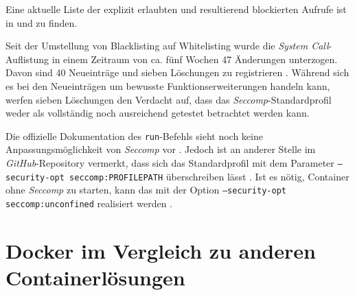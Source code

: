 \documentclass[../main.tex]{subfiles}
\begin{document}
			Eine aktuelle Liste der explizit erlaubten und resultierend blockierten Aufrufe ist in \cite{githubSeccompProfile} und \cite{githubSeccompDoc} zu finden.

			Seit der Umstellung von Blacklisting auf Whitelisting wurde die \emph{System Call}-Auflistung in einem Zeitraum von ca. fünf Wochen 47 Änderungen unterzogen. Davon sind 40 Neueinträge und sieben Löschungen zu registrieren \cite{githubSeccompProfileHistory}. Während sich es bei den Neueinträgen um bewusste Funktionserweiterungen handeln kann, werfen sieben Löschungen den Verdacht auf, dass das \emph{Seccomp}-Standardprofil weder als vollständig noch ausreichend getestet betrachtet werden kann.

			Die offizielle Dokumentation des \texttt{run}-Befehls sieht noch keine Anpassungsmöglichkeit von \emph{Seccomp} vor \cite{dockerRun}. Jedoch ist an anderer Stelle im \emph{GitHub}-Repository vermerkt, dass sich das Standardprofil mit dem Parameter \texttt{--security-opt seccomp:PROFILEPATH} überschreiben lässt \cite{githubSeccompDoc}. Ist es nötig, Container ohne \emph{Seccomp} zu starten, kann das mit der Option \texttt{--security-opt seccomp:unconfined} realisiert werden \cite{docker110Security}.

	\section{Docker im Vergleich zu anderen Containerlösungen}



\end{document}
